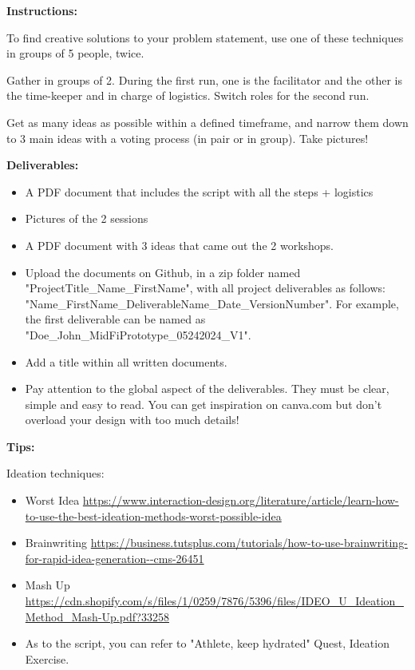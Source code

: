 \makeheaderfiles

\textbf{Instructions:}

To find creative solutions to your problem statement, use one of these techniques in groups of 5 people, twice.

Gather in groups of 2. During the first run, one is the facilitator and the other is the time-keeper and in charge of logistics. Switch roles for the second run.

Get as many ideas as possible within a defined timeframe, and narrow them down to 3 main ideas with a voting process (in pair or in group). Take pictures!

\textbf{Deliverables:}

\begin{itemize}
\item A PDF document that includes the script with all the steps + logistics
\item Pictures of the 2 sessions
\item A PDF document with 3 ideas that came out the 2 workshops.
\item Upload the documents on Github, in a zip folder named "ProjectTitle\_Name\_FirstName", with all project deliverables as follows: "Name\_FirstName\_DeliverableName\_Date\_VersionNumber".  For example, the first deliverable can be named as "Doe\_John\_MidFiPrototype\_05242024\_V1".
\item Add a title within all written documents.
\item Pay attention to the global aspect of the deliverables. They must be clear, simple and easy to read. You can get inspiration on canva.com but don't overload your design with too much details!
\end{itemize}

\textbf{Tips:}

Ideation techniques:

\begin{itemize}
\item Worst Idea \url{https://www.interaction-design.org/literature/article/learn-how-to-use-the-best-ideation-methods-worst-possible-idea}
\item Brainwriting \url{https://business.tutsplus.com/tutorials/how-to-use-brainwriting-for-rapid-idea-generation--cms-26451}
\item Mash Up \url{https://cdn.shopify.com/s/files/1/0259/7876/5396/files/IDEO_U_Ideation_Method_Mash-Up.pdf?33258}
\item As to the script, you can refer to "Athlete, keep hydrated" Quest, Ideation Exercise.
\end{itemize}

